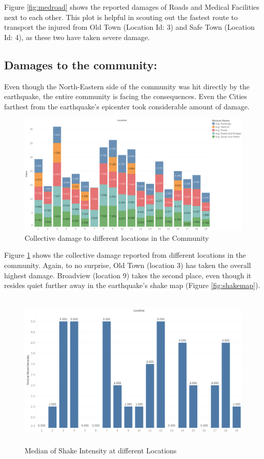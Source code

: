 \documentclass[12pt]{extarticle}
\begin{document}
 Figure \ref{fig:medroad} shows the reported damages of Roads and Medical Facilities next to each other. This plot is helpful in scouting out the fastest route to transport the injured from Old Town (Location Id: 3) and Safe Town (Location Id: 4), as these two have taken severe damage. 
 
 \subsection{Damages to the community:}
 \label{subsec:damage}
 Even though the North-Eastern side of the community was hit directly by the earthquake, the entire community is facing the consequences. Even the Cities farthest from the earthquake\rq{}s epicenter took considerable amount of damage. 
 
\begin{figure}[H]
\centering
	\includegraphics[height=0.43\linewidth, width=\linewidth]{Images/AllDamage.png}
	\caption{Collective damage to different locations in the Community}
	\label{fig:alldamage}
\end{figure}
 
 Figure \ref{fig:alldamage} shows the collective damage reported from different locations in the community. Again, to no surprise, Old Town (location 3) has taken the overall highest damage. Broadview (location 9) takes the second place, even though it resides quiet further away in the earthquake\rq{}s shake map (Figure \ref{fig:shakemap}). 

\begin{figure}[H]
\centering
	\includegraphics[height=75mm, width = 0.8\linewidth]{Images/ShakeInt.png}
	\caption{Median of Shake Intensity at different Locations}
	\label{fig:shakeint}
\end{figure}
\end{document}
